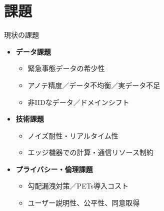 \documentclass[unicode,12pt,aspectratio=169,dvipdfmx]{beamer}
\begin{document}
\section{課題}
\begin{frame}{現状の課題}
  \begin{itemize}
    \item \textbf{データ課題}
      \begin{itemize}
        \item 緊急事態データの希少性
        \item アノテ精度／データ不均衡／実データ不足
        \item 非IIDなデータ／ドメインシフト
      \end{itemize}
    \item \textbf{技術課題}
      \begin{itemize}
        \item ノイズ耐性・リアルタイム性
        \item エッジ機器での計算・通信リソース制約
      \end{itemize}
    \item \textbf{プライバシー・倫理課題}
      \begin{itemize}
        \item 勾配漏洩対策／PETs導入コスト
        \item ユーザー説明性、公平性、同意取得
      \end{itemize}
  \end{itemize}
\end{frame}
\end{document}
